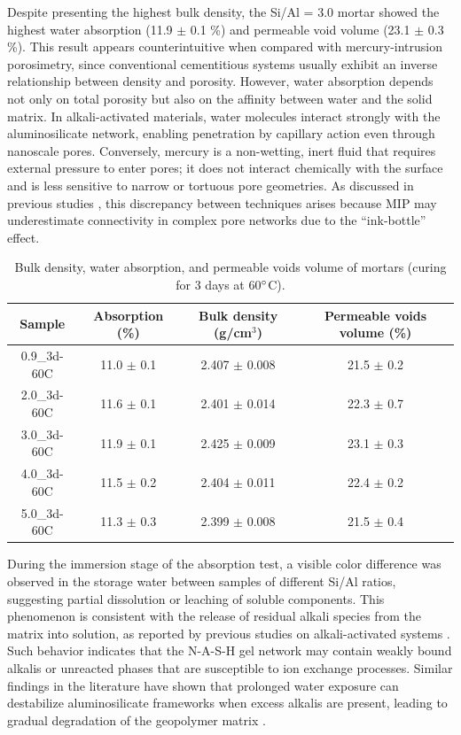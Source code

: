 Despite presenting the highest bulk density, the Si/Al = 3.0 mortar showed the highest water absorption (11.9 $\pm$ 0.1 \%) and permeable void volume (23.1 $\pm$ 0.3 \%).
This result appears counterintuitive when compared with mercury-intrusion porosimetry, since conventional cementitious systems usually exhibit an inverse relationship between density and porosity.
However, water absorption depends not only on total porosity but also on the affinity between water and the solid matrix.
In alkali-activated materials, water molecules interact strongly with the aluminosilicate network, enabling penetration by capillary action even through nanoscale pores.
Conversely, mercury is a non-wetting, inert fluid that requires external pressure to enter pores; it does not interact chemically with the surface and is less sensitive to narrow or tortuous pore geometries.
As discussed in previous studies \cite{Provis2014_LowCa}, this discrepancy between techniques arises because MIP may underestimate connectivity in complex pore networks due to the “ink-bottle” effect.

\begin{table}[H]
  \centering
  \caption{Bulk density, water absorption, and permeable voids volume of mortars (curing for 3 days at 60$^{\circ}$C).}
  \label{tab:bulk_density_water_absorption}
  \begin{tabular}{cccc}
    \hline
    Sample & Absorption (\%) & Bulk density (g/cm$^3$) & Permeable voids volume (\%) \\
    \hline
    0.9\_3d-60C & 11.0 $\pm$ 0.1 & 2.407 $\pm$ 0.008 & 21.5 $\pm$ 0.2 \\
    2.0\_3d-60C & 11.6 $\pm$ 0.1 & 2.401 $\pm$ 0.014 & 22.3 $\pm$ 0.7 \\
    3.0\_3d-60C & 11.9 $\pm$ 0.1 & 2.425 $\pm$ 0.009 & 23.1 $\pm$ 0.3 \\
    4.0\_3d-60C & 11.5 $\pm$ 0.2 & 2.404 $\pm$ 0.011 & 22.4 $\pm$ 0.2 \\
    5.0\_3d-60C & 11.3 $\pm$ 0.3 & 2.399 $\pm$ 0.008 & 21.5 $\pm$ 0.4 \\
    \hline
  \end{tabular}
\end{table}

During the immersion stage of the absorption test, a visible color difference was observed in the storage water between samples of different Si/Al ratios, suggesting partial dissolution or leaching of soluble components.
This phenomenon is consistent with the release of residual alkali species from the matrix into solution, as reported by previous studies on alkali-activated systems \cite{pachecotorgal2014handbook}.
Such behavior indicates that the N-A-S-H gel network may contain weakly bound alkalis or unreacted phases that are susceptible to ion exchange processes.
Similar findings in the literature have shown that prolonged water exposure can destabilize aluminosilicate frameworks when excess alkalis are present, leading to gradual degradation of the geopolymer matrix \cite{Brito2008}.

